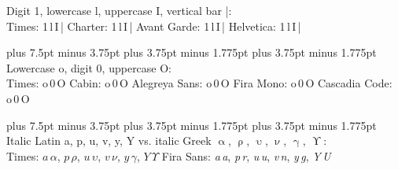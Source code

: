 \documentclass[11pt, a4paper, oneside]{article}
\newlength{\baselinedist}
\newlength{\smalllinespacing}
\newlength{\fsnormal}
\newlength{\fssmall}
\let \normalsizeOrig \normalsize
\let \smallOrig \small
\def\normalsize{%
		\normalsizeOrig%
		\fontsize{\fsnormal}{\baselinedist}\selectfont%
		\abovedisplayskip 13.5pt plus 6.75pt minus 3.375pt%
		\belowdisplayskip \abovedisplayskip%
		\abovedisplayshortskip 6.75pt plus 3.375pt minus 1.6875pt%
		\belowdisplayshortskip 6.75pt plus 3.375pt minus 1.6875pt%
	}
\def\normalsize{%
		\normalsizeOrig%
		\fontsize{\fsnormal}{\baselinedist}\selectfont%
		\abovedisplayskip 15pt plus 7.5pt minus 3.75pt%
		\belowdisplayskip \abovedisplayskip%
		\abovedisplayshortskip 7.5pt plus 3.75pt minus 1.775pt%
		\belowdisplayshortskip 7.5pt plus 3.75pt minus 1.775pt%
	}
\renewcommand{\small}{\smallOrig\fontsize{\fssmall}{\smalllinespacing}\selectfont}
\theoremstyle{Plain}
\theoremstyle{Definition}
\theoremstyle{Remark}
\begin{document}
\begin{longtblr}{}
	Digit 1, lowercase l, uppercase I, vertical bar |: \\
	\small%
	{\selectfont Times: 1\,l\,I\,|} \quad
	{\selectfont Charter: 1\,l\,I\,|} \quad
	{\selectfont Avant Garde: 1\,l\,I\,|} \quad
	{\selectfont Helvetica: 1\,l\,I\,|} 
	\par
	\normalsize%
	Lowercase o, digit 0, uppercase O: \\
	\small%
	{\selectfont Times: o\,0\,O}\quad
	{\selectfont Cabin: o\,0\,O}\quad
	{\selectfont Alegreya Sans: o\,0\,O}\quad
	{\selectfont Fira Mono: o\,0\,O}\quad
	{\selectfont Cascadia Code: o\,0\,O}
	\par
	\normalsize%
	Italic Latin a, p, u, v, y, Y vs. italic Greek $\upalpha$, $\uprho$, $\upupsilon$, $\upnu$, $\upgamma$, $\upUpsilon$: \\
	\small%
	Times: $a \, \alpha$, $p \, \rho$, $u \, \upsilon$, $v \, \nu$, $y \, \gamma$, $Y \, \mathit{\Upsilon}$
	\quad
	{\selectfont Fira Sans: {\itshape a\,{\selectfont a}}, {\itshape p\,{\selectfont r}}, {\itshape u\,{\selectfont u}}, {\itshape v\,{\selectfont n}}, {\itshape y\,{\selectfont g}}, {\itshape Y\,{\selectfont U}}}
\end{longtblr}
\end{document}
